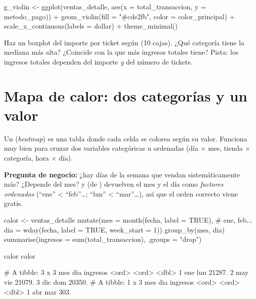 \begin{rcode}
g_violin <- ggplot(ventas_detalle,
                   aes(x = total_transaccion, y = metodo_pago)) +
  geom_violin(fill = "#cde2fb", color = color_principal) +
  scale_x_continuous(labels = dollar) +
  theme_minimal()
\end{rcode}

\begin{hazlotu}
Haz un boxplot del importe por ticket según  (10 cajas).
¿Qué categoría tiene la mediana más alta? ¿Coincide con la que más ingresos
totales tiene? Pista: los ingresos totales dependen del importe \emph{y} del
número de tickets.
\end{hazlotu}

\section{Mapa de calor: dos categorías y un valor}
\label{sec:m3-calor}

Un  (\emph{heatmap}) es una tabla donde cada celda se
colorea según su valor. Funciona muy bien para cruzar dos variables
categóricas u ordenadas (día $\times$ mes, tienda $\times$ categoría, hora
$\times$ día).

\textbf{Pregunta de negocio:} ¿hay días de la semana que vendan
sistemáticamente más? ¿Depende del mes? 
y  (de
) devuelven el mes y el día como \emph{factores
ordenados} (``ene'' < ``feb''\ldots; ``lun'' < ``mar''\ldots), así que el
orden correcto viene gratis.

\begin{rcode}
calor <- ventas_detalle %
  mutate(mes = month(fecha, label = TRUE),                 # ene, feb...
         dia = wday(fecha, label = TRUE, week_start = 1)) %
  group_by(mes, dia) %
  summarise(ingresos = sum(total_transaccion), .groups = "drop")

calor %
calor %
\end{rcode}
\begin{rsalida}
# A tibble: 3 x 3
  mes   dia   ingresos
  <ord> <ord>    <dbl>
1 ene   lun     21287.
2 may   vie     21079.
3 dic   dom     20350.
# A tibble: 1 x 3
  mes   dia   ingresos
  <ord> <ord>    <dbl>
1 abr   mar       303.
\end{rsalida}

